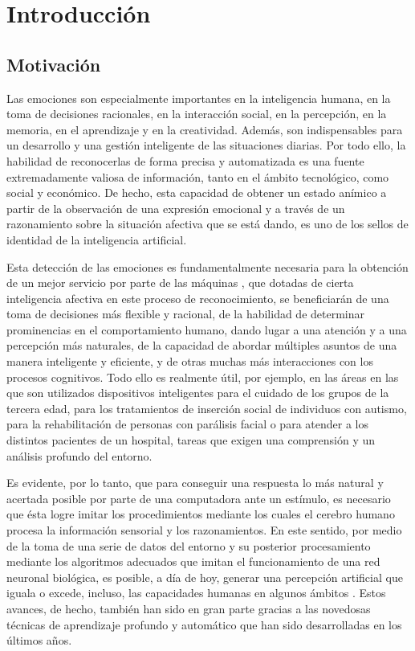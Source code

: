 \chapter{Introducción}

\section{Motivación}
Las emociones son especialmente importantes en la inteligencia humana, en la toma de decisiones racionales, en la interacción social, en la percepción, en la memoria, en el aprendizaje y en la creatividad. Además, son indispensables para un desarrollo y una gestión inteligente de las situaciones diarias. Por todo ello, la habilidad de reconocerlas de forma precisa y automatizada es una fuente extremadamente valiosa de información, tanto en el ámbito tecnológico, como social y económico. De hecho, esta capacidad de obtener un estado anímico a partir de la observación de una expresión emocional y a través de un razonamiento sobre la situación afectiva que se está dando, es uno de los sellos de identidad de la inteligencia artificial.

Esta detección de las emociones es fundamentalmente necesaria para la obtención de un mejor servicio por parte de las máquinas \cite{Picard}, que dotadas de cierta inteligencia afectiva en este proceso de reconocimiento, se beneficiarán de una toma de decisiones más flexible y racional, de la habilidad de determinar prominencias en el comportamiento humano, dando lugar a una atención y a una percepción más naturales, de la capacidad de abordar múltiples asuntos de una manera inteligente y eficiente, y de otras muchas más interacciones con los procesos cognitivos. Todo ello es realmente útil, por ejemplo, en las áreas en las que son utilizados dispositivos inteligentes para el cuidado de los grupos de la tercera edad, para los tratamientos de inserción social de individuos con autismo, para la rehabilitación de personas con parálisis facial o para atender a los distintos pacientes de un hospital, tareas que exigen una comprensión y un análisis profundo del entorno.

Es evidente, por lo tanto, que para conseguir una respuesta lo más natural y acertada posible por parte de una computadora ante un estímulo, es necesario que ésta logre imitar los procedimientos mediante los cuales el cerebro humano procesa la información sensorial y los razonamientos. En este sentido, por medio de la toma de una serie de datos del entorno y su posterior procesamiento mediante los algoritmos adecuados que imitan el funcionamiento de una red neuronal biológica, es posible, a día de hoy, generar una percepción artificial que iguala o excede, incluso, las capacidades humanas en algunos ámbitos \cite{AIreport}. Estos avances, de hecho, también han sido en gran parte gracias a las novedosas técnicas de aprendizaje profundo y automático que han sido desarrolladas en los últimos años.

